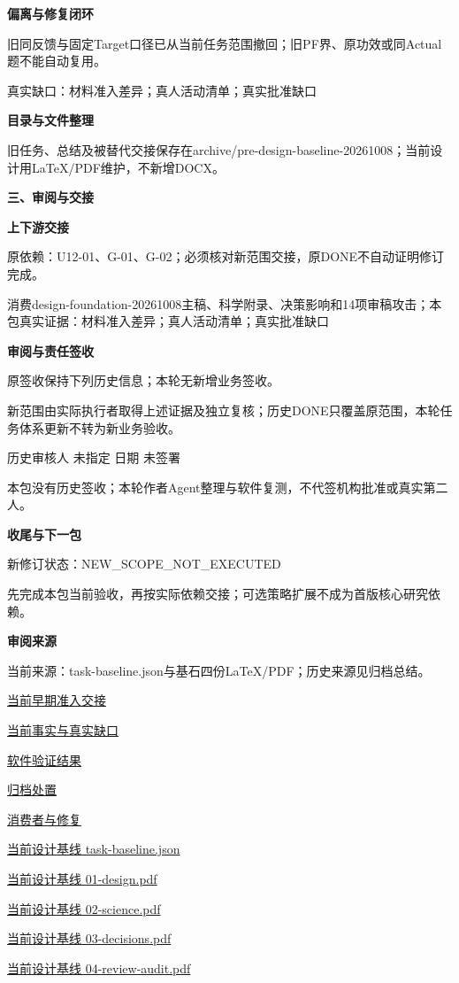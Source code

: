 \documentclass[11pt,a4paper]{article}
\newcommand{\reviewsection}[1]{\par\Needspace{5\baselineskip}\vspace{10pt}\begin{center}{\titlelatin\titlecjk\bfseries\fontsize{14}{20}\selectfont #1}\end{center}}
\newcommand{\reviewsubsection}[1]{\par\Needspace{4\baselineskip}\vspace{4pt}\begin{center}{\titlelatin\titlecjk\bfseries\fontsize{12}{18}\selectfont #1}\end{center}}
\begin{document}
\reviewsubsection{2.3 偏离与修复闭环}
旧同反馈与固定Target口径已从当前任务范围撤回；旧PF界、原功效或同Actual题不能自动复用。


真实缺口：材料准入差异；真人活动清单；真实批准缺口


\reviewsubsection{2.4 目录与文件整理}
旧任务、总结及被替代交接保存在archive/\allowbreak{}pre-\allowbreak{}design-\allowbreak{}baseline-\allowbreak{}20261008；当前设计用LaTeX/\allowbreak{}PDF维护，不新增DOCX。


\reviewsection{三、审阅与交接}
\reviewsubsection{3.1 上下游交接}
原依赖：U12-\allowbreak{}01、G-\allowbreak{}01、G-\allowbreak{}02；必须核对新范围交接，原DONE不自动证明修订完成。


消费design-\allowbreak{}foundation-\allowbreak{}20261008主稿、科学附录、决策影响和14项审稿攻击；本包真实证据：材料准入差异；真人活动清单；真实批准缺口


\reviewsubsection{3.2 审阅与责任签收}
原签收保持下列历史信息；本轮无新增业务签收。


新范围由实际执行者取得上述证据及独立复核；历史DONE只覆盖原范围，本轮任务体系更新不转为新业务验收。


历史审核人 未指定    日期 未签署


本包没有历史签收；本轮作者Agent整理与软件复测，不代签机构批准或真实第二人。


\reviewsubsection{3.3 收尾与下一包}
新修订状态：NEW\_\allowbreak{}SCOPE\_\allowbreak{}NOT\_\allowbreak{}EXECUTED


先完成本包当前验收，再按实际依赖交接；可选策略扩展不成为首版核心研究依赖。


\reviewsubsection{3.4 审阅来源}
当前来源：task-\allowbreak{}baseline.json与基石四份LaTeX/\allowbreak{}PDF；历史来源见归档总结。


\href{file:///D:/Agent/srp/agent/tasks/U12-05/outputs/current-admission.md}{当前早期准入交接}


\href{file:///D:/Agent/srp/agent/tasks/U12-05/outputs/current-admission.json}{当前事实与真实缺口}


\href{file:///D:/Agent/srp/agent/tasks/U12-05/evidence/verification.json}{软件验证结果}


\href{file:///D:/Agent/srp/agent/tasks/U12-05/archive/README.md}{归档处置}


\href{file:///D:/Agent/srp/agent/tasks/U12-05/evidence/consumer-impact.md}{消费者与修复}


\href{file:///D:/Agent/srp/agent/design/design-foundation-20261008/task-baseline.json}{当前设计基线 task-\allowbreak{}baseline.json}


\href{file:///D:/Agent/srp/agent/design/design-foundation-20261008/01-design.pdf}{当前设计基线 01-\allowbreak{}design.pdf}


\href{file:///D:/Agent/srp/agent/design/design-foundation-20261008/02-science.pdf}{当前设计基线 02-\allowbreak{}science.pdf}


\href{file:///D:/Agent/srp/agent/design/design-foundation-20261008/03-decisions.pdf}{当前设计基线 03-\allowbreak{}decisions.pdf}


\href{file:///D:/Agent/srp/agent/design/design-foundation-20261008/04-review-audit.pdf}{当前设计基线 04-\allowbreak{}review-\allowbreak{}audit.pdf}
\end{document}
